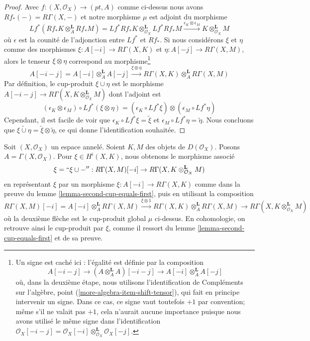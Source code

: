 {\begin{proof}
Avec $f : (X, \mathcal{O}_X) \to (pt, A)$ comme ci-dessus nous avons
$Rf_*(-) = R\Gamma(X, -)$ et notre morphisme $\mu$ est adjoint du morphisme
$$
Lf^*(Rf_*K \otimes_A^\mathbf{L} Rf_*M) =
Lf^*Rf_*K \otimes_{\mathcal{O}_X}^\mathbf{L} Lf^*Rf_*M
\xrightarrow{\epsilon_K \otimes \epsilon_M}
K \otimes_{\mathcal{O}_X}^\mathbf{L} M
$$
où $\epsilon$ est la counité de l'adjonction entre
$Lf^*$ et $Rf_*$. Si nous considérons $\xi$ et $\eta$ comme des morphismes $\xi : A[-i] \to R\Gamma(X, K)$
et $\eta : A[-j] \to R\Gamma(X, M)$, alors le tenseur $\xi \otimes \eta$ correspond au morphisme\footnote{Un signe est caché ici : l'égalité est définie par la composition
$$
A[-i - j] \to (A \otimes_A^\mathbf{L} A)[-i - j] \to
A[-i] \otimes_A^\mathbf{L} A[-j]
$$
où, dans la deuxième étape, nous utilisons l'identification de Compléments sur l'algèbre, point (\ref{more-algebra-item-shift-tensor}), qui fait en principe intervenir un signe. Dans ce cas, ce signe vaut toutefois $+1$ par convention; même s'il ne valait pas
$+1$, cela n'aurait aucune importance puisque nous avons utilisé le même signe dans l'identification
$\mathcal{O}_X[-i - j] =
\mathcal{O}_X[-i] \otimes_{\mathcal{O}_X}^\mathbf{L} \mathcal{O}_X[-j]$.}
$$
A[-i - j] = A[-i] \otimes_A^\mathbf{L} A[-j]
\xrightarrow{\xi \otimes \eta}
R\Gamma(X, K) \otimes_A^\mathbf{L} R\Gamma(X, M)
$$
Par définition, le cup-produit $\xi \cup \eta$ est le morphisme
$A[-i - j] \to R\Gamma(X, K \otimes_{\mathcal{O}_X}^\mathbf{L} M)$
dont l'adjoint est
$$
(\epsilon_K \otimes \epsilon_M) \circ Lf^*(\xi \otimes \eta) =
(\epsilon_K \circ Lf^*\xi) \otimes (\epsilon_M \circ Lf^*\eta)
$$
Cependant, il est facile de voir que
$\epsilon_K \circ Lf^*\xi = \tilde \xi$ et
$\epsilon_M \circ Lf^*\eta = \tilde \eta$. Nous concluons que $\widetilde{\xi \cup \eta} = \tilde \xi \otimes \tilde \eta$,
ce qui donne l'identification souhaitée.

\end{proof}

\begin{remark}

\label{remark-cup-with-element-map-total-cohomology}
Soit $(X, \mathcal{O}_X)$ un espace annelé. Soient $K, M$ des objets de $D(\mathcal{O}_X)$. Posons $A = \Gamma(X, \mathcal{O}_X)$. Pour $\xi \in H^i(X, K)$, nous obtenons le morphisme associé $$
\xi = ``\xi \cup -'' :
R\Gamma(X, M)[-i]
\to
R\Gamma(X, K \otimes_{\mathcal{O}_X}^\mathbf{L} M)
$$ en représentant $\xi$ par un morphisme $\xi : A[-i] \to R\Gamma(X, K)$ comme dans la preuve du lemme \ref{lemma-second-cup-equals-first}, puis en utilisant la composition $$
R\Gamma(X, M)[-i] = A[-i] \otimes_A^\mathbf{L} R\Gamma(X, M)
\xrightarrow{\xi \otimes 1}
R\Gamma(X, K) \otimes_A^\mathbf{L} R\Gamma(X, M)
\to
R\Gamma(X, K \otimes_{\mathcal{O}_X}^\mathbf{L} M)
$$ où la deuxième flèche est le cup-produit global $\mu$ ci-dessus. En cohomologie, on retrouve ainsi le cup-produit par $\xi$, comme il ressort du lemme \ref{lemma-second-cup-equals-first} et de sa preuve.
\end{remark}

}

